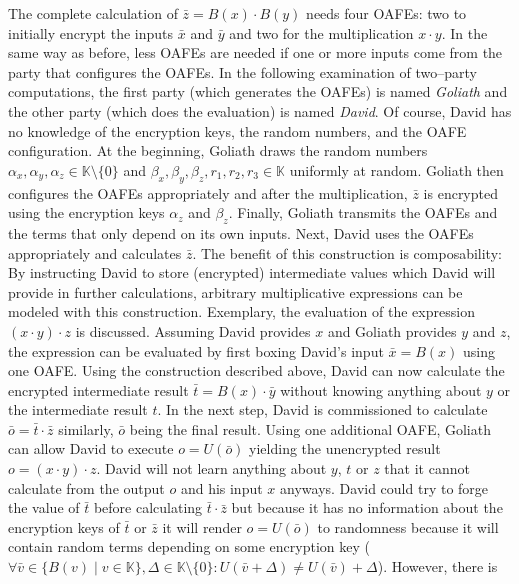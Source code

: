 \noindent{}The complete calculation of $\bar{z} = B(x) \cdot B(y)$ needs four
OAFEs: two to initially encrypt the inputs $\bar x$ and $\bar y$ and two for the
multiplication $x \cdot y$. In the same way as before, less OAFEs are needed if
one or more inputs come from the party that configures the OAFEs. In the
following examination of two--party computations, the first party (which
generates the OAFEs) is named \emph{Goliath} and the other party (which does the
evaluation) is named \emph{David}. Of course, David has no knowledge of the
encryption keys, the random numbers, and the OAFE configuration. At the
beginning, Goliath draws the random numbers $\alpha_x, \alpha_y, \alpha_z \in
\mathbb{K} \setminus \{0\}$ and $\beta_x, \beta_y, \beta_z, r_1, r_2, r_3 \in
\mathbb{K}$ uniformly at random.  Goliath then configures the OAFEs
appropriately and after the multiplication, $\bar{z}$ is encrypted using the
encryption keys $\alpha_z$ and $\beta_z$. Finally, Goliath transmits the OAFEs
and the terms that only depend on its own inputs. Next, David uses the OAFEs
appropriately and calculates $\bar{z}$. The benefit of this construction is
composability: By instructing David to store (encrypted) intermediate values
which David will provide in further calculations, arbitrary multiplicative
expressions can be modeled with this construction. Exemplary, the evaluation of
the expression $(x \cdot y) \cdot z$ is discussed. Assuming David provides $x$
and Goliath provides $y$ and $z$, the expression can be evaluated by first
boxing David's input $\bar{x} = B(x)$ using one OAFE. Using the construction
described above, David can now calculate the encrypted intermediate result
$\bar{t} = B(x) \cdot \bar{y}$ without knowing anything about $y$ or the
intermediate result $t$. In the next step, David is commissioned to calculate
$\bar{o} = \bar{t} \cdot \bar{z}$ similarly, $\bar{o}$ being the final result.
Using one additional OAFE, Goliath can allow David to execute $o = U(\bar{o})$
yielding the unencrypted result $o = (x \cdot y) \cdot z$. David will not learn
anything about $y$, $t$ or $z$ that it cannot calculate from the output $o$ and
his input $x$ anyways. David could try to forge the value of $\bar{t}$ before
calculating $\bar{t} \cdot \bar{z}$ but because it has no information about the
encryption keys of $\bar{t}$ or $\bar{z}$ it will render $o = U(\bar{o})$ to
randomness because it will contain random terms depending on some encryption key
($\forall \bar{v} \in \{B(v) \mid v \in \mathbb{K}\}, \Delta \in \mathbb{K}
\setminus \{0\}: U(\bar{v}+\Delta) \neq U(\bar{v})+\Delta$).  However, there is
